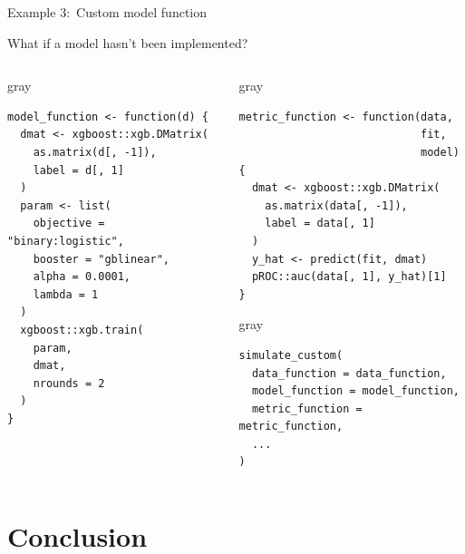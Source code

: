 \documentclass[11pt]{beamer}
\begin{document}
\begin{frame}[c,fragile]{Example 3:\ Custom model function}

	What if a model hasn't been implemented?        \vspace{-0.5em}%

	\begin{columns}
		\begin{column}[T]{0.5\textwidth}
			\begin{cbox}{gray}{}%
				\begin{verbatim}
model_function <- function(d) {
  dmat <- xgboost::xgb.DMatrix(
    as.matrix(d[, -1]),
    label = d[, 1]
  )
  param <- list(
    objective = "binary:logistic",
    booster = "gblinear",
    alpha = 0.0001,
    lambda = 1
  )
  xgboost::xgb.train(
    param,
    dmat,
    nrounds = 2
  )
}
            \end{verbatim}
			\end{cbox}

		\end{column}
		\begin{column}[T]{0.55\textwidth}
			\begin{cbox}{gray}{}%
				\begin{verbatim}
metric_function <- function(data,
                            fit,
                            model) {
  dmat <- xgboost::xgb.DMatrix(
    as.matrix(data[, -1]), 
    label = data[, 1]
  )
  y_hat <- predict(fit, dmat)
  pROC::auc(data[, 1], y_hat)[1]
}
            \end{verbatim}
			\end{cbox}

			\begin{cbox}{gray}{}%
				\begin{verbatim}
simulate_custom(
  data_function = data_function,
  model_function = model_function,
  metric_function = metric_function,
  ...
)
            \end{verbatim}
			\end{cbox}
		\end{column}
	\end{columns}

\end{frame}

\section{Conclusion}
\end{document}
